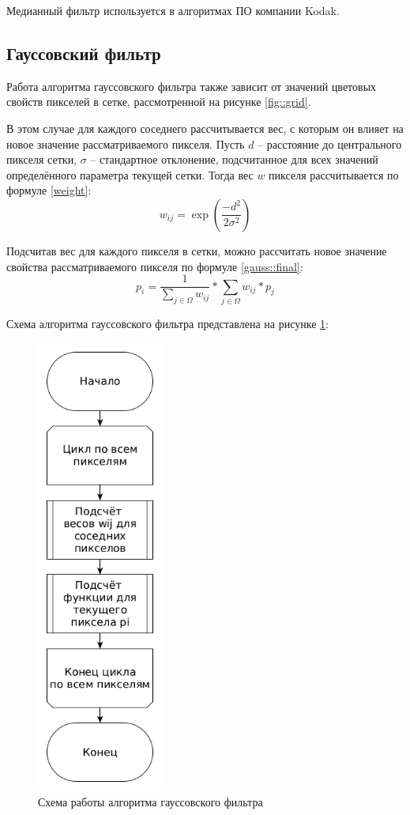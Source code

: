Медианный фильтр используется в алгоритмах ПО компании Kodak.


\subsection{Гауссовский фильтр}
Работа алгоритма гауссовского фильтра также зависит от значений цветовых свойств пикселей в сетке, рассмотренной на рисунке \ref{fig::grid}.

В этом случае для каждого соседнего рассчитывается вес, с которым он влияет на новое значение рассматриваемого пикселя. 
Пусть $d$ -- расстояние до центрального пикселя сетки, $\sigma$ -- стандартное отклонение, подсчитанное для всех значений определённого параметра текущей сетки.
Тогда вес $w$ пикселя рассчитывается по формуле \ref{weight}:
\begin{equation}
	\label{weight}
	w_{ij} = \exp(\frac{-d^2}{2\sigma^2})
\end{equation}

Подсчитав вес для каждого пикселя в сетки, можно рассчитать новое значение свойства рассматриваемого пикселя по формуле \ref{gauss::final}:
\begin{equation}
	\label{gauss::final}
	p_i = \frac{1}{\sum_{j \in \Omega}^{} w_{ij}} * \sum_{j \in \Omega}^{} w_{ij} * p_j 
\end{equation}

Схема алгоритма гауссовского фильтра представлена на рисунке \ref{fig::gauss}:
\FloatBarrier
\begin{figure}[h]	
	\begin{center}
		\includegraphics[height=15cm]{inc/png/gauss.png}
	\end{center}
	\captionsetup{justification=centering}
	\caption{Схема работы алгоритма гауссовского фильтра}
	\label{fig::gauss}
\end{figure}
\FloatBarrier

